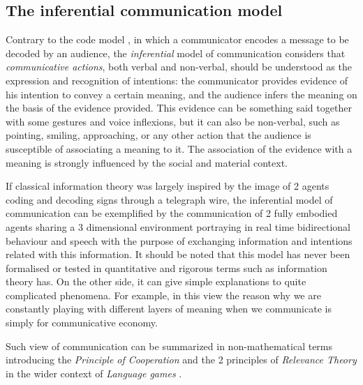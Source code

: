 \documentclass[
		twoside,openright,titlepage,numbers=noenddot,manychapters,
		headinclude,%
                footinclude=false,cleardoublepage=empty,
                BCOR=5mm,
		fontsize=11pt, %
                 enabledeprecatedfontcommands]{scrreprt}
\begin{document}
\subsection{The inferential communication model}

Contrary to the code model \cite[]{shannon48}, in which a communicator encodes a message to be decoded by an audience, the \emph{inferential} model of communication considers that \emph{communicative actions}, both verbal and non-verbal, should be understood as the expression and recognition of intentions: the communicator provides evidence of his intention to convey a certain meaning, and the audience infers the meaning on the basis of the evidence provided. This evidence can be something said together with some gestures and voice inflexions, but it can also be non-verbal, such as pointing, smiling, approaching, or any other action that the audience is susceptible of associating a meaning to it. The association of the evidence with a meaning is strongly influenced by the social and material context.


If classical information theory was largely inspired by the image of 2 agents coding and decoding signs through a telegraph wire, the inferential model of communication can be exemplified by the communication of 2 fully embodied agents sharing a 3 dimensional environment portraying in real time bidirectional behaviour and speech with the purpose of exchanging information and intentions related with this information. It should be noted that this model has never been formalised or tested in quantitative and rigorous terms such as information theory has. On the other side, it can give simple explanations to quite complicated phenomena. For example, in this view the reason why we are constantly playing with different layers of meaning when we communicate is simply for communicative economy. 


 Such view of communication can be summarized in non-mathematical terms introducing  the  \emph{Principle of Cooperation} \cite[]{grice200lac} and the 2 principles of \emph{Relevance Theory} \cite[]{sperber2004rt} in the wider context of \emph{Language games} \cite[]{wittgenstein1953pit}. 
\end{document}
